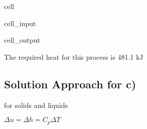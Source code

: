 \documentclass[letterpaper,10pt,english]{jupyterBook}
\begin{document}
\begin{sphinxuseclass}{cell}
\begin{sphinxVerbatimInput}
\begin{sphinxuseclass}{cell_input}
\end{sphinxuseclass}\end{sphinxVerbatimInput}
\begin{sphinxVerbatimOutput}

\begin{sphinxuseclass}{cell_output}
\begin{sphinxVerbatim}[commandchars=\\\{\}]
The required heat for this process is 481.1 kJ
\end{sphinxVerbatim}

\end{sphinxuseclass}\end{sphinxVerbatimOutput}

\end{sphinxuseclass}

\subsection{Solution Approach for c)}
\label{\detokenize{notebooks/Chapter5/CH5-Q2:solution-approach-for-c}}
\sphinxAtStartPar
for solids and liquids

\sphinxAtStartPar
\(\Delta u=\Delta h=C_p\Delta T\)
\end{document}
